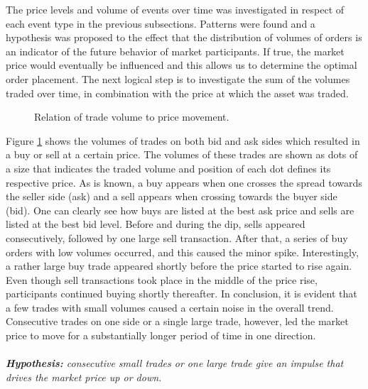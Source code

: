 The price levels and volume of events over time was investigated in respect of each event type in the previous subsections.
Patterns were found and a hypothesis was proposed to the effect that the distribution of volumes of orders is an indicator of the future behavior of market participants. If true, the market price would eventually be influenced and this allows us to determine the optimal order placement.
The next logical step is to investigate the sum of the volumes traded over time, in combination with the price at which the asset was traded.
\begin{figure}[H]
    \centering
    \caption{Relation of trade volume to price movement.}
    \label{fig:data-trade-volume}
\end{figure}
Figure \ref{fig:data-trade-volume} shows the volumes of trades on both bid and ask sides which resulted in a buy or sell at a certain price.
The volumes of these trades are shown as dots of a size that indicates the traded volume and position of each dot defines its respective price.
As is known, a buy appears when one crosses the spread towards the seller side (ask) and a sell appears when crossing towards the buyer side (bid).
One can clearly see how buys are listed at the best ask price and sells are listed at the best bid level.
Before and during the dip, sells appeared consecutively, followed by one large sell transaction.
After that, a series of buy orders with low volumes occurred, and this  caused the minor spike.
Interestingly, a rather large buy trade appeared shortly before the price started to rise again.
Even though sell transactions took place in the middle of the price rise, participants continued buying shortly thereafter.
In conclusion, it is evident that a few trades with small volumes caused a certain noise in the overall trend.
Consecutive trades on one side or a single large trade, however, led the market price to move for a substantially longer period of time in one direction.
\\
\\
\textit{\textbf{Hypothesis:} consecutive small trades or one large trade give an impulse that drives the market price up or down.}


